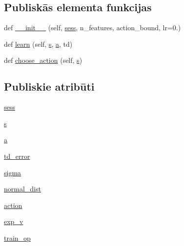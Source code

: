 \subsection*{Publiskās elementa funkcijas}
\begin{DoxyCompactItemize}
\item 
def \hyperlink{classddpg__others_1_1_actor_a98635ab068dfa432844a7007d34f923f}{\+\_\+\+\_\+init\+\_\+\+\_\+} (self, \hyperlink{classddpg__others_1_1_actor_af03e8adeb78531e4599419007664842c}{sess}, n\+\_\+features, action\+\_\+bound, lr=0.)
\item 
def \hyperlink{classddpg__others_1_1_actor_a24e5b40ab12e8d9e6e6eb92385576327}{learn} (self, \hyperlink{classddpg__others_1_1_actor_aa37c0b7d4b4dcc84ab6dd6295a53ef94}{s}, \hyperlink{classddpg__others_1_1_actor_a0f1edbd513cea82df55361aa67ad8794}{a}, td)
\item 
def \hyperlink{classddpg__others_1_1_actor_afef72403fadcc61b70c575d93affd7c1}{choose\+\_\+action} (self, \hyperlink{classddpg__others_1_1_actor_aa37c0b7d4b4dcc84ab6dd6295a53ef94}{s})
\end{DoxyCompactItemize}
\subsection*{Publiskie atribūti}
\begin{DoxyCompactItemize}
\item 
\hyperlink{classddpg__others_1_1_actor_af03e8adeb78531e4599419007664842c}{sess}
\item 
\hyperlink{classddpg__others_1_1_actor_aa37c0b7d4b4dcc84ab6dd6295a53ef94}{s}
\item 
\hyperlink{classddpg__others_1_1_actor_a0f1edbd513cea82df55361aa67ad8794}{a}
\item 
\hyperlink{classddpg__others_1_1_actor_a0b3c557a9af387b1f53279af860d2e57}{td\+\_\+error}
\item 
\hyperlink{classddpg__others_1_1_actor_aed5f0fdc4a7a7ccf996781511f379f29}{sigma}
\item 
\hyperlink{classddpg__others_1_1_actor_a4568b60363c36199737afcb5f7737d8f}{normal\+\_\+dist}
\item 
\hyperlink{classddpg__others_1_1_actor_af0e54cc024b2982a2dea08d5e9091d2b}{action}
\item 
\hyperlink{classddpg__others_1_1_actor_a09356bb2eb8c4b490d6e87ff42e0391d}{exp\+\_\+v}
\item 
\hyperlink{classddpg__others_1_1_actor_a32ca210848490a09496872c1dc69c6a4}{train\+\_\+op}
\end{DoxyCompactItemize}


